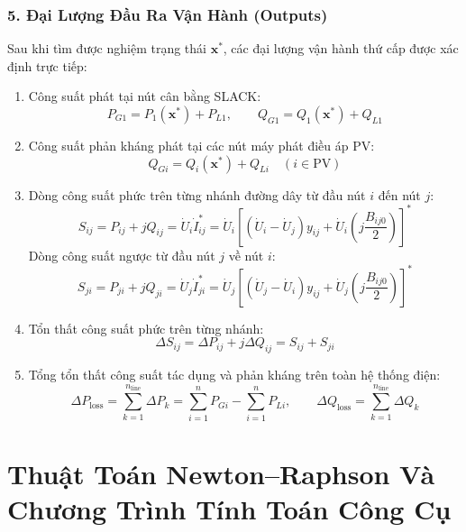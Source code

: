 \documentclass[12pt,a4paper,oneside]{report}
\begin{document}
\subsection{5. Đại Lượng Đầu Ra Vận Hành (Outputs)}
Sau khi tìm được nghiệm trạng thái $\mathbf{x}^*$, các đại lượng vận hành thứ cấp được xác định trực tiếp:
\begin{enumerate}
    \item Công suất phát tại nút cân bằng SLACK:
    \begin{equation}
    P_{G1} = P_1(\mathbf{x}^*) + P_{L1}, \qquad Q_{G1} = Q_1(\mathbf{x}^*) + Q_{L1}
    \end{equation}
    \item Công suất phản kháng phát tại các nút máy phát điều áp PV:
    \begin{equation}
    Q_{Gi} = Q_i(\mathbf{x}^*) + Q_{Li} \quad (i \in \text{PV})
    \end{equation}
    \item Dòng công suất phức trên từng nhánh đường dây từ đầu nút $i$ đến nút $j$:
    \begin{equation}
    S_{ij} = P_{ij} + jQ_{ij} = \dot{U}_i \dot{I}_{ij}^* = \dot{U}_i \left[ (\dot{U}_i - \dot{U}_j) y_{ij} + \dot{U}_i \left( j \frac{B_{ij0}}{2} \right) \right]^*
    \end{equation}
    Dòng công suất ngược từ đầu nút $j$ về nút $i$:
    \begin{equation}
    S_{ji} = P_{ji} + jQ_{ji} = \dot{U}_j \dot{I}_{ji}^* = \dot{U}_j \left[ (\dot{U}_j - \dot{U}_i) y_{ij} + \dot{U}_j \left( j \frac{B_{ij0}}{2} \right) \right]^*
    \end{equation}
    \item Tổn thất công suất phức trên từng nhánh:
    \begin{equation}
    \Delta S_{ij} = \Delta P_{ij} + j \Delta Q_{ij} = S_{ij} + S_{ji}
    \end{equation}
    \item Tổng tổn thất công suất tác dụng và phản kháng trên toàn hệ thống điện:
    \begin{equation}
    \Delta P_{\text{loss}} = \sum_{k=1}^{n_{\text{line}}} \Delta P_k = \sum_{i=1}^n P_{Gi} - \sum_{i=1}^n P_{Li}, \qquad \Delta Q_{\text{loss}} = \sum_{k=1}^{n_{\text{line}}} \Delta Q_k
    \end{equation}
\end{enumerate}

\chapter{Thuật Toán Newton--Raphson Và Chương Trình Tính Toán Công Cụ}
\end{document}

